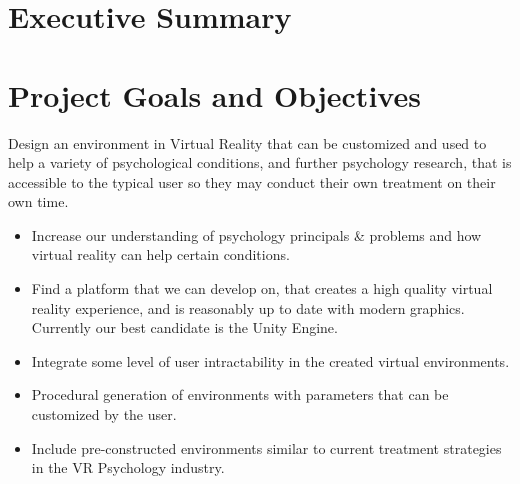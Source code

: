 \documentclass[a4paper,10pt]{article}
\begin{document}


\section{Executive Summary}

\pagebreak
\section{Project Goals and Objectives}
	Design an environment in Virtual Reality that can be customized and used to help a variety of psychological conditions, and further psychology research, that is accessible to the typical user so they may conduct their own treatment on their own time.
	\begin{itemize}
		\item Increase our understanding of psychology principals \& problems and how virtual reality can help certain conditions.
		\item Find a platform that we can develop on, that creates a high quality virtual reality experience, and is reasonably up to date with modern graphics. Currently our best candidate is the Unity Engine.
		\item Integrate some level of user intractability in the created virtual environments. 
		\item Procedural generation of environments with parameters that can be customized by the user. 
		\item Include pre-constructed environments similar to current treatment strategies in the VR Psychology industry.
	\end{itemize}
\end{document}

